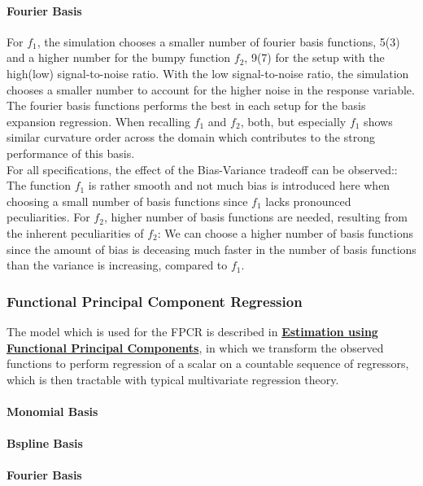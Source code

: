 \documentclass[11pt,twoside,a4paper]{article}
\begin{document}
	\paragraph{Fourier Basis}
	For $f_1$, the simulation chooses a smaller number of fourier basis functions, 5(3) and a higher number for the bumpy function $f_2$, 9(7) for the setup with the high(low) signal-to-noise ratio. With the low signal-to-noise ratio, the simulation chooses a smaller number to account for the higher noise in the response variable. The fourier basis functions performs the best in each setup for the basis expansion regression. When recalling $f_1$ and $f_2$, both, but especially $f_1$ shows similar curvature order across the domain which contributes to the strong performance of this basis.
	\\
	
	
	For all specifications, the effect of the Bias-Variance tradeoff can be observed:: The function $f_1$ is rather smooth and not much bias is introduced here when choosing a small number of basis functions since $f_1$ lacks pronounced peculiarities. For $f_2$, higher number of basis functions are needed, resulting from the inherent peculiarities of $f_2$: We can choose a higher number of basis functions since the amount of bias is deceasing much faster in the number of basis functions than the variance is increasing, compared to $f_1$. 
	
	
	
	\subsubsection{Functional Principal Component Regression}
	The model which is used for the FPCR is described in \hyperref[fpc_exp_transf]{\textbf{Estimation using Functional Principal Components}}, in which we transform the observed functions to perform regression of a scalar on a countable sequence of regressors, which is then tractable with typical multivariate regression theory. 

	
	\paragraph{Monomial Basis}
	\paragraph{Bspline Basis}
	\paragraph{Fourier Basis}
	
\end{document}
